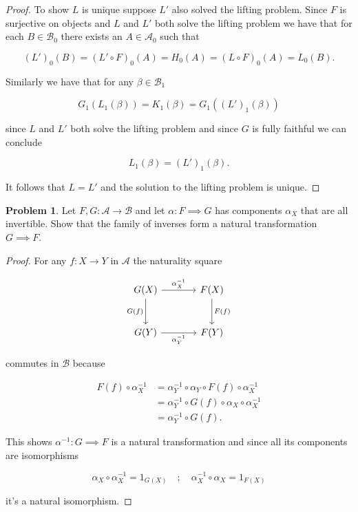 \documentclass[11pt]{amsart}
\theoremstyle{plain}
\theoremstyle{definition}
\newtheorem{prob}{Problem}
\newcommand{\cA}{{\mathcal A}}
\newcommand{\cB}{{\mathcal B}}
\newcommand{\noi}{{\noindent}}
\begin{document}
\begin{proof}
\noi To show $L$ is unique suppose $L'$ also solved the lifting problem. Since $F$ is surjective on objects and $L$ and $L'$ both solve the lifting problem we have that for each $B \in \cB_0$ there exists an $A \in \cA_0$ such that 

\[ (L')_0(B) = (L' \circ F)_0 (A) = H_0(A) = (L \circ F)_0(A) = L_0(B) . \]

\noi Similarly we have that for any $\beta \in \cB_1$ 

\[G_1 (L_1(\beta)) = K_1(\beta) = G_1((L')_1 (\beta))\]

\noi since $L$ and $L'$ both solve the lifting problem and since $G$ is fully faithful we can conclude 

\[ L_1 (\beta) = (L')_1(\beta).\]

\noi It follows that $L = L'$ and the solution to the lifting problem is unique. 
\end{proof}


\begin{prob}
Let $F, G : \cA \to \cB$ and let $\alpha : F \implies G$ has components $\alpha_X$ that are all invertible. Show that the family of inverses form a natural transformation $G \implies F$.
\end{prob}
\begin{proof}
For any $f : X \to Y$ in $\cA$ the naturality square 

\[ \begin{tikzcd}[column sep = large, row sep = large]
G(X) \dar["G(f)"'] \rar["\alpha^{-1}_X"] & F(X) \dar["F(f)"] \\
G(Y) \rar["\alpha_Y^{-1}"'] & F(Y)
\end{tikzcd}\]

\noi commutes in $\cB$ because 

\begin{align*}
F(f) \circ \alpha_X^{-1} 
&= \alpha_Y^{-1} \circ \alpha_Y \circ  F(f) \circ \alpha_X^{-1} \\
&= \alpha_Y^{-1} \circ G(f) \circ \alpha_X \circ \alpha_X^{-1} \\
&= \alpha_Y^{-1} \circ G(f).
\end{align*}

\noi This shows $\alpha^{-1} : G \implies F$ is a natural transformation and since all its components are isomorphisms 

\[ \alpha_X \circ \alpha_X^{-1} = 1_{G(X)}\quad ; \quad \alpha_X^{-1} \circ \alpha_X = 1_{F(X)}\]

\noi it's a natural isomorphism.
\end{proof}
\end{document}

